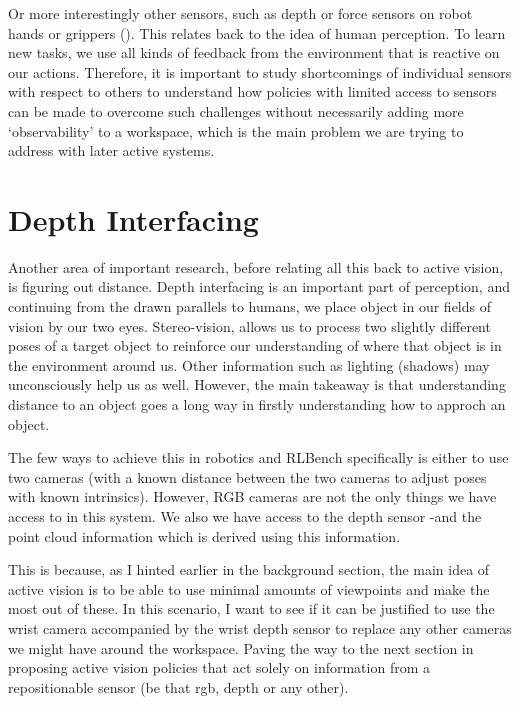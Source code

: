 Or more interestingly other sensors, such as depth or force sensors on robot hands or grippers (). This relates back to the idea of human perception. To learn new tasks, we use all kinds of feedback from the environment that is reactive on our actions. Therefore, it is important to study shortcomings of individual sensors with respect to others to understand how policies with limited access to sensors can be made to overcome such challenges without necessarily adding more `observability' to a workspace, which is the main problem we are trying to address with later active systems.


\section{Depth Interfacing}
Another area of important research, before relating all this back to active vision, is figuring out distance. Depth interfacing is an important part of perception, and continuing from the drawn parallels to humans, we place object in our fields of vision by our two eyes. Stereo-vision, allows us to process two slightly different poses of a target object to reinforce our understanding of where that object is in the environment around us. Other information such as lighting (shadows) may unconsciously help us as well. However, the main takeaway is that understanding distance to an object goes a long way in firstly understanding how to approch an object.

The few ways to achieve this in robotics and RLBench specifically is either to use two cameras (with a known distance between the two cameras to adjust poses with known intrinsics). However, RGB cameras are not the only things we have access to in this system. We also we have access to the depth sensor -and the point cloud information which is derived using this information.

This is because, as I hinted earlier in the background section, the main idea of active vision is to be able to use minimal amounts of viewpoints and make the most out of these. In this scenario, I want to see if it can be justified to use the wrist camera accompanied by the wrist depth sensor to replace any other cameras we might have around the workspace. Paving the way to the next section in proposing active vision policies that act solely on information from a repositionable sensor (be that rgb, depth or any other).

